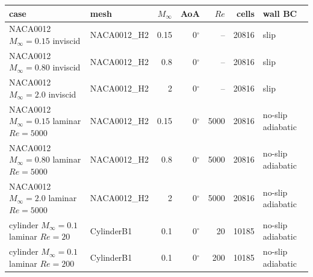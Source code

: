\footnotesize
\begin{tabular}{llrrrrl}
\toprule
case & mesh & $M_\infty$ & AoA & $Re$ & cells & wall BC\\
\midrule
NACA0012 $M_\infty=0.15$ inviscid & NACA0012\_H2 & 0.15 & 0$^\circ$ & -- & 20816 & slip\\
NACA0012 $M_\infty=0.80$ inviscid & NACA0012\_H2 & 0.8 & 0$^\circ$ & -- & 20816 & slip\\
NACA0012 $M_\infty=2.0$ inviscid & NACA0012\_H2 & 2 & 0$^\circ$ & -- & 20816 & slip\\
NACA0012 $M_\infty=0.15$ laminar $Re=5000$ & NACA0012\_H2 & 0.15 & 0$^\circ$ & 5000 & 20816 & no-slip adiabatic\\
NACA0012 $M_\infty=0.80$ laminar $Re=5000$ & NACA0012\_H2 & 0.8 & 0$^\circ$ & 5000 & 20816 & no-slip adiabatic\\
NACA0012 $M_\infty=2.0$ laminar $Re=5000$ & NACA0012\_H2 & 2 & 0$^\circ$ & 5000 & 20816 & no-slip adiabatic\\
cylinder $M_\infty=0.1$ laminar $Re=20$ & CylinderB1 & 0.1 & 0$^\circ$ & 20 & 10185 & no-slip adiabatic\\
cylinder $M_\infty=0.1$ laminar $Re=200$ & CylinderB1 & 0.1 & 0$^\circ$ & 200 & 10185 & no-slip adiabatic\\
\bottomrule
\end{tabular}
